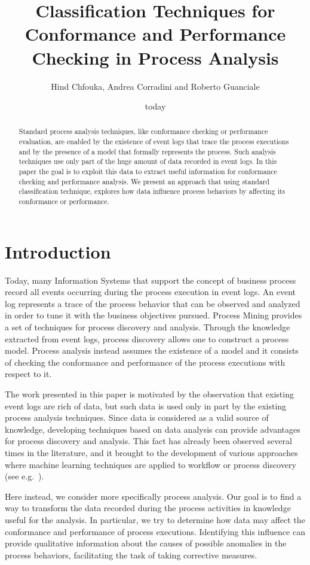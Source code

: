 \documentclass{llncs}
\title{Classification Techniques for Conformance and Performance Checking in Process Analysis}
\author{Hind Chfouka\inst{1}, Andrea Corradini\inst{1} and Roberto Guanciale\inst{2}}
\institute{Department of Computer Science, University of Pisa, Italy\and School of Computer Science and Communication,
KTH Royal Institute of Technology, Stockholm, Sweden}
\date{today}
\begin{document}
\maketitle
\begin{abstract}
Standard process analysis techniques, like conformance checking or performance evaluation, are enabled by the existence of event logs that trace the process executions and by the presence of a model that formally represents the process. Such analysis techniques use only part of the huge amount of data recorded in event logs. In this paper the goal is to exploit this data to extract useful information for  conformance checking and  performance analysis. We present an approach that using standard classification technique, explores how data influence process behaviors by affecting its conformance or performance.
\end{abstract}

\section{Introduction}
Today, many Information Systems that support  the concept of business process record all events occurring during the process execution in  event logs. An event log represents a trace of the process behavior that can be observed and analyzed in order to tune it with the business objectives pursued. Process Mining provides a set of techniques for process discovery and analysis. Through the knowledge extracted from event logs, process discovery allows one to construct a process model. Process analysis instead assumes the existence of a model and it consists of checking the conformance and performance of the process executions with respect to it.

The work presented in this paper is motivated by the observation that existing event logs are rich of data, but such data is used only in part by the existing process analysis techniques. Since data is considered as a valid source of knowledge, developing techniques based on data analysis can provide advantages for  process discovery and analysis.
This fact has already been observed several times in the literature, and it brought to the development of various approaches where machine learning techniques are applied to workflow or process discovery (see e.g.~\cite{DBLP:conf/ecml/Herbst00,Maruster-PHD,DBLP:conf/bpm/RozinatA06,DBLP:conf/sac/LeoniA13}).

Here instead, we consider more specifically process analysis. Our goal is to find a way to transform the data recorded during the process activities in knowledge useful for the analysis.  In particular,  we try to determine how data may affect the conformance and performance of process executions. Identifying this influence can provide qualitative information about the causes of possible anomalies in the process behaviors, facilitating the task of taking corrective measures.
\end{document}
